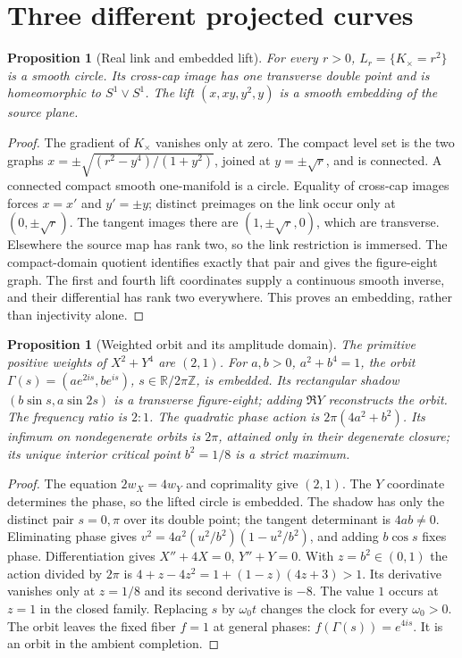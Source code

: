 \documentclass[11pt]{article}
\theoremstyle{readable}
\newtheorem{proposition}[theorem]{Proposition}
\theoremstyle{remark}\newtheorem{remark}[theorem]{Remark}
\newcommand{\R}{\mathbb R}\newcommand{\C}{\mathbb C}\newcommand{\Z}{\mathbb Z}
\begin{document}
\section{Three different projected curves}\label{sec:links}
\begin{proposition}[Real link and embedded lift]
For every $r>0$, $L_r=\{K_\times=r^2\}$ is a smooth circle. Its cross-cap
image has one transverse double point and is homeomorphic to $S^1\vee S^1$.
The lift $(x,xy,y^2,y)$ is a smooth embedding of the source plane.
\end{proposition}
\begin{proof}
The gradient of $K_\times$ vanishes only at zero. The compact level set is
the two graphs $x=\pm\sqrt{(r^2-y^4)/(1+y^2)}$, joined at
$y=\pm\sqrt r$, and is connected. A connected compact smooth one-manifold
is a circle. Equality of cross-cap images forces $x=x'$ and $y'=\pm y$;
distinct preimages on the link occur only at $(0,\pm\sqrt r)$.
The tangent images there are $(1,\pm\sqrt r,0)$, which are transverse.
Elsewhere the source map has rank two, so the link restriction is immersed.
The compact-domain quotient identifies exactly that pair and gives the
figure-eight graph. The first and fourth lift coordinates supply a continuous
smooth inverse, and their differential has rank two everywhere. This proves
an embedding, rather than injectivity alone.
\end{proof}

\begin{proposition}[Weighted orbit and its amplitude domain]
The primitive positive weights of $X^2+Y^4$ are $(2,1)$.
For $a,b>0$, $a^2+b^4=1$, the orbit
$\Gamma(s)=(ae^{2is},be^{is})$, $s\in\R/2\pi\Z$, is embedded.
Its rectangular shadow $(b\sin s,a\sin2s)$ is a transverse figure-eight;
adding $\Re Y$ reconstructs the orbit. The frequency ratio is $2:1$.
The quadratic phase action is $2\pi(4a^2+b^2)$. Its infimum on
nondegenerate orbits is $2\pi$, attained only in their degenerate closure;
its unique interior critical point $b^2=1/8$ is a strict maximum.
\end{proposition}
\begin{proof}
The equation $2w_X=4w_Y$ and coprimality give $(2,1)$.
The $Y$ coordinate determines the phase, so the lifted circle is embedded.
The shadow has only the distinct pair $s=0,\pi$ over its double point;
the tangent determinant is $4ab\ne0$. Eliminating phase gives
$v^2=4a^2(u^2/b^2)(1-u^2/b^2)$, and adding $b\cos s$ fixes phase.
Differentiation gives $X''+4X=0$, $Y''+Y=0$.
With $z=b^2\in(0,1)$ the action divided by $2\pi$ is
$4+z-4z^2=1+(1-z)(4z+3)>1$. Its derivative vanishes only at $z=1/8$
and its second derivative is $-8$. The value $1$ occurs at $z=1$ in the
closed family. Replacing $s$ by $\omega_0 t$ changes the clock for every
$\omega_0>0$. The orbit leaves the fixed fiber $f=1$ at general phases:
$f(\Gamma(s))=e^{4is}$. It is an orbit in the ambient completion.
\end{proof}
\end{document}
